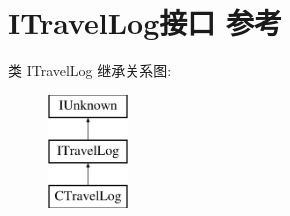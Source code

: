 \hypertarget{interface_i_travel_log}{}\section{I\+Travel\+Log接口 参考}
\label{interface_i_travel_log}
类 I\+Travel\+Log 继承关系图\+:\begin{figure}[H]
\begin{center}
\leavevmode
\includegraphics[height=3.000000cm]{interface_i_travel_log}
\end{center}
\end{figure}
